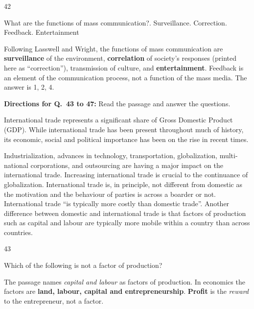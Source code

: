 \begin{question}{42}
{What are the functions of mass communication?. Surveillance. Correction. Feedback. Entertainment\par}
\begin{explain}
Following Lasswell and Wright, the functions of mass communication are \textbf{surveillance} of the environment, \textbf{correlation} of society's responses (printed here as ``correction''), transmission of culture, and \textbf{entertainment}. Feedback is an element of the communication process, not a function of the mass media. The answer is 1, 2, 4.
\end{explain}
\end{question}

\begin{context}
\textbf{Directions for Q.~43 to 47:} Read the passage and answer the questions.\par\smallskip
International trade represents a significant share of Gross Domestic Product (GDP). While international trade has been present throughout much of history, its economic, social and political importance has been on the rise in recent times.

Industrialization, advances in technology, transportation, globalization, multi-national corporations, and outsourcing are having a major impact on the international trade. Increasing international trade is crucial to the continuance of globalization. International trade is, in principle, not different from domestic as the motivation and the behaviour of parties is across a boarder or not. International trade ``is typically more costly than domestic trade''. Another difference between domestic and international trade is that factors of production such as capital and labour are typically more mobile within a country than across countries.
\end{context}
\begin{question}{43}
{Which of the following is not a factor of production?\par}
\begin{explain}
The passage names \emph{capital and labour} as factors of production. In economics the factors are \textbf{land, labour, capital and entrepreneurship}. \textbf{Profit} is the \emph{reward} to the entrepreneur, not a factor.
\end{explain}
\end{question}

